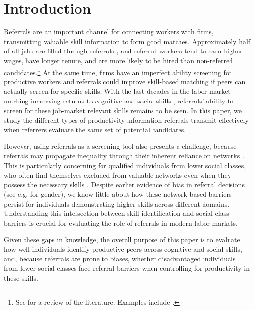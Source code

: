 \documentclass[11pt,a4paper,oneside]{article}
\begin{document}
\section{Introduction}
Referrals are an important channel for connecting workers with firms, transmitting valuable skill information to form good matches. Approximately half of all jobs are filled through referrals \citep{topa2011labor}, and referred workers tend to earn higher wages, have longer tenure, and are more likely to be hired than non-referred candidates.\footnote{See \citet{topa2019social} for a review of the literature. Examples include \citet{brown2016informal, bayer2008place, hellerstein2014labor, hellerstein2019labor, schmutte2015job, dustmann2016referral,friebel2023employee}.} At the same time, firms have an imperfect ability screening for productive workers \citep{macleod2017big} and referrals could improve skill-based matching if peers can actually screen for specific skills. With the last decades in the labor market marking increasing returns to cognitive and social skills \citep{deming2017growing,deming2023multidimensional}, referrals' ability to screen for these job-market relevant skills remains to be seen. In this paper, we study the different types of productivity information referrals transmit effectively when referrers evaluate the same set of potential candidates.

However, using referrals as a screening tool also presents a challenge, because referrals may propagate inequality through their inherent reliance on networks \citep{bolte_role_2021,jackson2021inequality}. This is particularly concerning for qualified individuals from lower social classes, who often find themselves excluded from valuable networks even when they possess the necessary skills \citep{stansbury2024class,chetty2022social_a}. Despite earlier evidence of bias in referral decisions (see e.g. \citet{beaman_job_2018} for gender), we know little about how these network-based barriers persist for individuals demonstrating higher skills across different domains. Understanding this intersection between skill identification and social class barriers is crucial for evaluating the role of referrals in modern labor markets.

Given these gaps in knowledge, the overall purpose of this paper is to evaluate how well individuals identify productive peers across cognitive and social skills, and, because referrals are prone to biases, whether disadvantaged individuals from lower social classes face referral barriers when controlling for productivity in these skills.
\end{document}
